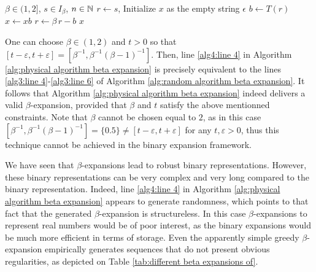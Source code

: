   \begin{algorithm}[ht]
	\caption{Physical algorithm for $\beta$-expansion}\label{alg:physical algorithm beta expansion}
	\begin{algorithmic}[1]
		\Require $\beta \in (1,2]$, $s \in I_\beta$, $n\in\mathbb{N}$
		\State $r \gets s$, 
		\State Initialize $x$ as the empty string $\epsilon$
			\State $b \gets T(r)$  \label{alg4:line 4}
			\State $x \gets xb$
			\State $r \gets \beta \, r -  b$
		\EndFor
		\State \Return $x$
	\end{algorithmic}
	\end{algorithm}
  
  One can choose $\beta \in (1,2)$ and $t > 0$ so that $[t - \varepsilon, t + \varepsilon] = [\beta^{-1}, \beta^{-1}(\beta-1)^{-1}]$. Then, line \ref{alg4:line 4} in Algorithm \ref{alg:physical algorithm beta expansion} is precisely equivalent to the lines \ref{alg3:line 4}-\ref{alg3:line 6} of Algorithm \ref{alg:random algorithm beta expansion}. It follows that Algorithm \ref{alg:physical algorithm beta expansion} indeed delivers a valid $\beta$-expansion, provided that $\beta$ and $t$ satisfy the above mentionned constraints. Note that $\beta$ cannot be chosen equal to $2$, as in this case $[\beta^{-1}, \beta^{-1}(\beta-1)^{-1}] = \{0.5\}\neq [t - \varepsilon, t + \varepsilon]$ for any $t,\varepsilon > 0$, thus this technique cannot be achieved in the binary expansion framework.
  
  We have seen that $\beta$-expansions lead to robust binary representations. However, these binary representations can be very complex and very long compared to the binary representation. Indeed, line \ref{alg4:line 4} in Algorithm \ref{alg:physical algorithm beta expansion} appears to generate randomness, which points to that fact that the generated $\beta$-expansion is structureless. In this case $\beta$-expansions to represent real numbers would be of poor interest, as the binary expansions would be much more efficient in terms of storage. Even the apparently simple greedy $\beta$-expansion empirically generates sequences that do not present obvious regularities, as depicted on Table \ref{tab:different beta expansions of}.

